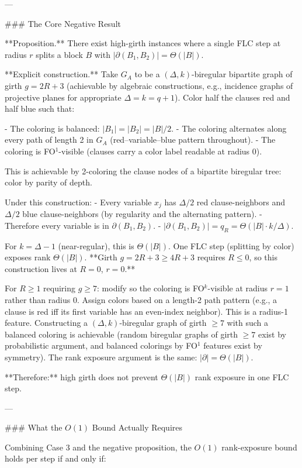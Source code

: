 ---

### The Core Negative Result

**Proposition.** There exist high-girth instances where a single FLC step at radius $r$ splits a block $B$ with $|\partial(B_1, B_2)| = \Theta(|B|)$.

**Explicit construction.** Take $G_A$ to be a $(\Delta, k)$-biregular bipartite graph of girth $g = 2R+3$ (achievable by algebraic constructions, e.g., incidence graphs of projective planes for appropriate $\Delta = k = q+1$). Color half the clauses red and half blue such that:

- The coloring is balanced: $|B_1| = |B_2| = |B|/2$.
- The coloring alternates along every path of length 2 in $G_A$ (red–variable–blue pattern throughout).
- The coloring is FO$^1$-visible (clauses carry a color label readable at radius 0).

This is achievable by 2-coloring the clause nodes of a bipartite biregular tree: color by parity of depth.

Under this construction:
- Every variable $x_j$ has $\Delta/2$ red clause-neighbors and $\Delta/2$ blue clause-neighbors (by regularity and the alternating pattern).
- Therefore every variable is in $\partial(B_1, B_2)$.
- $|\partial(B_1, B_2)| = q_R = \Theta(|B| \cdot k/\Delta)$.

For $k = \Delta - 1$ (near-regular), this is $\Theta(|B|)$. One FLC step (splitting by color) exposes rank $\Theta(|B|)$. **Girth $g = 2R+3 \geq 4R+3$ requires $R \leq 0$, so this construction lives at $R=0$, $r=0$.**

For $R \geq 1$ requiring $g \geq 7$: modify so the coloring is FO$^k$-visible at radius $r=1$ rather than radius 0. Assign colors based on a length-2 path pattern (e.g., a clause is red iff its first variable has an even-index neighbor). This is a radius-1 feature. Constructing a $(\Delta,k)$-biregular graph of girth $\geq 7$ with such a balanced coloring is achievable (random biregular graphs of girth $\geq 7$ exist by probabilistic argument, and balanced colorings by FO$^1$ features exist by symmetry). The rank exposure argument is the same: $|\partial| = \Theta(|B|)$.

**Therefore:** high girth does not prevent $\Theta(|B|)$ rank exposure in one FLC step.

---

### What the $O(1)$ Bound Actually Requires

Combining Case 3 and the negative proposition, the $O(1)$ rank-exposure bound holds per step if and only if:

